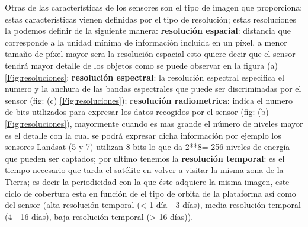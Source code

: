Otras de las características de los sensores son el tipo de imagen que proporciona; estas características vienen definidas por el tipo de resolución; estas resoluciones la podemos definir de la siguiente manera: \textbf{resolución espacial}: distancia que corresponde a la unidad mínima de información incluida en un píxel, a menor tamaño de píxel mayor sera la resolución espacial esto quiere decir que el sensor tendrá mayor detalle de los objetos como se puede observar en la figura (a) \ref{Fig:resoluciones};  
\textbf{resolución espectral}: la resolución espectral especifica el numero y la anchura de las bandas espectrales que puede ser discriminadas por el sensor (fig: (c) \ref{Fig:resoluciones}); \textbf{resolución radiometrica}: indica el numero de bits utilizados para expresar los datos recogidos por el sensor (fig: (b) \ref{Fig:resoluciones}), mayormente cuando es mas grande el número de niveles mayor es el detalle con la cual se podrá expresar dicha información por ejemplo los sensores Landsat (5 y 7) utilizan 8 bits lo que da 2**8= 256 niveles de energía que pueden ser captados; por ultimo tenemos la \textbf{resolución temporal}: es el tiempo necesario que tarda el satélite en volver a visitar la misma zona de la Tierra; es decir la periodicidad con la que éste adquiere la misma imagen, este ciclo de cobertura esta en función de el tipo de orbita de la plataforma así como del sensor (alta resolución temporal (< 1 día - 3 días), media resolución temporal (4 - 16 días), baja resolución temporal (> 16 días)).



